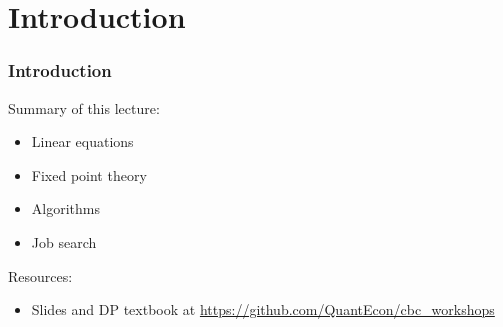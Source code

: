 


\subtitle{Prelude to Dynamic Programming}

\author{John Stachurski}

\date{September 2022}




\begin{frame}
  \titlepage
\end{frame}


\section{Introduction}


\begin{frame}
    \frametitle{Introduction}

    Summary of this lecture:

    \begin{itemize}
        \item Linear equations
            \vspace{0.3em}
        \item Fixed point theory
            \vspace{0.3em}
        \item Algorithms
            \vspace{0.3em}
        \item Job search
    \end{itemize}

            \vspace{0.3em}
            \vspace{0.3em}

    Resources:
    \begin{itemize}
        \item Slides and DP textbook at \url{https://github.com/QuantEcon/cbc_workshops}
    \end{itemize}

\end{frame}



    


